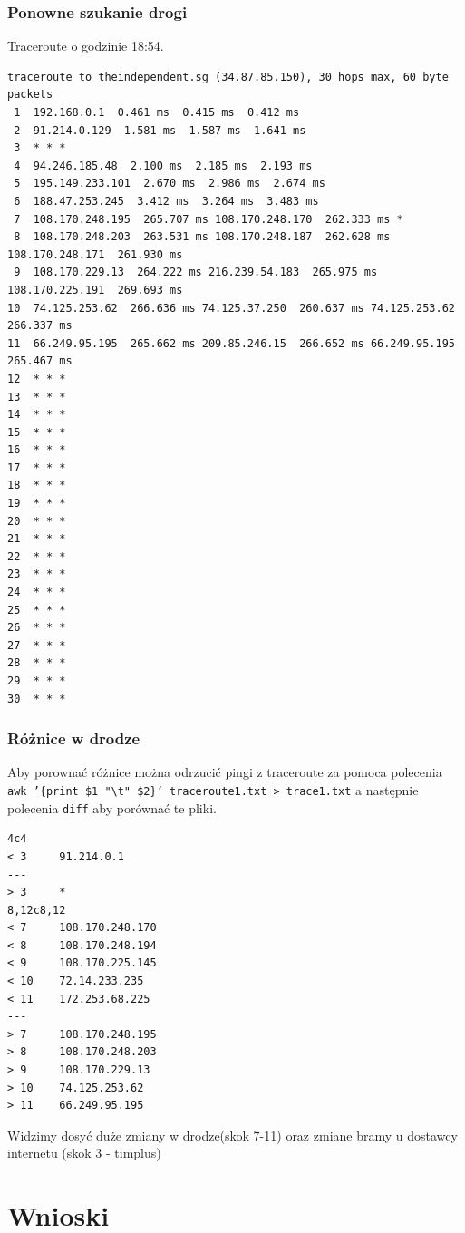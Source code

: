 \documentclass[11pt]{article}
\begin{document}
\subsubsection{Ponowne szukanie drogi}
\label{sec:org43b1d4b}
Traceroute o godzinie 18:54.
\begin{verbatim}
traceroute to theindependent.sg (34.87.85.150), 30 hops max, 60 byte packets
 1  192.168.0.1  0.461 ms  0.415 ms  0.412 ms
 2  91.214.0.129  1.581 ms  1.587 ms  1.641 ms
 3  * * *
 4  94.246.185.48  2.100 ms  2.185 ms  2.193 ms
 5  195.149.233.101  2.670 ms  2.986 ms  2.674 ms
 6  188.47.253.245  3.412 ms  3.264 ms  3.483 ms
 7  108.170.248.195  265.707 ms 108.170.248.170  262.333 ms *
 8  108.170.248.203  263.531 ms 108.170.248.187  262.628 ms 108.170.248.171  261.930 ms
 9  108.170.229.13  264.222 ms 216.239.54.183  265.975 ms 108.170.225.191  269.693 ms
10  74.125.253.62  266.636 ms 74.125.37.250  260.637 ms 74.125.253.62  266.337 ms
11  66.249.95.195  265.662 ms 209.85.246.15  266.652 ms 66.249.95.195  265.467 ms
12  * * *
13  * * *
14  * * *
15  * * *
16  * * *
17  * * *
18  * * *
19  * * *
20  * * *
21  * * *
22  * * *
23  * * *
24  * * *
25  * * *
26  * * *
27  * * *
28  * * *
29  * * *
30  * * *
\end{verbatim}
\subsubsection{Różnice w drodze}
\label{sec:orgdc0a00e}
Aby porownać różnice można odrzucić pingi z traceroute za pomoca polecenia \texttt{awk '\{print \$1 "\textbackslash{}t" \$2\}' traceroute1.txt > trace1.txt} a następnie polecenia \texttt{diff} aby porównać te pliki.
\begin{verbatim}
4c4
< 3     91.214.0.1
---
> 3     *
8,12c8,12
< 7     108.170.248.170
< 8     108.170.248.194
< 9     108.170.225.145
< 10    72.14.233.235
< 11    172.253.68.225
---
> 7     108.170.248.195
> 8     108.170.248.203
> 9     108.170.229.13
> 10    74.125.253.62
> 11    66.249.95.195
\end{verbatim}
Widzimy dosyć duże zmiany w drodze(skok 7-11) oraz zmiane bramy u dostawcy internetu (skok 3 - timplus)




\section{Wnioski}
\label{sec:org3002bd9}
\end{document}
